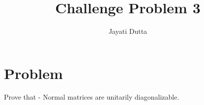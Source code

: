 \documentclass[journal,12pt,twocolumn]{IEEEtran}
\begin{document}
\let\StandardTheFigure\thefigure
\let\vec\mathbf
\renewcommand{\thefigure}{\theproblem}



\def\putbox#1#2#3{\makebox[0in][l]{\makebox[#1][l]{}\raisebox{\baselineskip}[0in][0in]{\raisebox{#2}[0in][0in]{#3}}}}
     \def\rightbox#1{\makebox[0in][r]{#1}}
     \def\centbox#1{\makebox[0in]{#1}}
     \def\topbox#1{\raisebox{-\baselineskip}[0in][0in]{#1}}
     \def\midbox#1{\raisebox{-0.5\baselineskip}[0in][0in]{#1}}

\vspace{3cm}


\title{Challenge Problem 3}
\author{Jayati Dutta}





\maketitle

\newpage


\bigskip

\renewcommand{\thefigure}{\theenumi}
\renewcommand{\thetable}{\theenumi}



%



\section{Problem}
Prove that - Normal matrices are unitarily diagonalizable.
\end{document}

